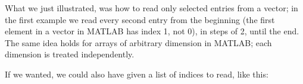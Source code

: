 What we just illustrated, was how to read only selected entries from a vector; in the first example we read every second entry from the beginning (the first element in a vector in MATLAB has index 1, not 0), in steps of 2, until the end.
The same idea holds for arrays of arbitrary dimension in MATLAB; each dimension is treated independently.

If we wanted, we could also have given a list of indices to read, like this: